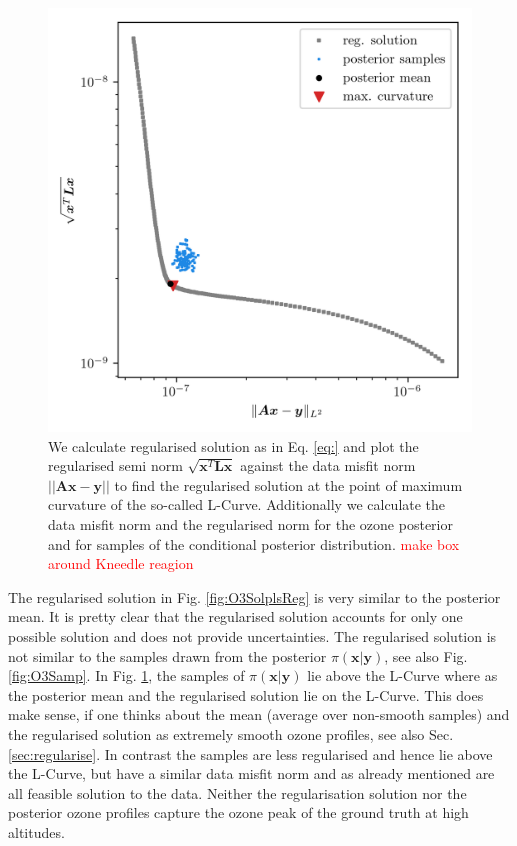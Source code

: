 \begin{figure}[ht!]
	\centering
	\includegraphics{LCurvePhD.png}
	\caption[Plot of the L-curve to find the regularised solution.]{We calculate regularised solution as in Eq. \ref{eq:} and plot the regularised semi norm $\sqrt{\bm{x}^T\bm{Lx}}$ against the data misfit norm $||\bm{Ax} -\bm{y} ||$ to find the regularised solution at the point of maximum curvature of the so-called L-Curve. Additionally we calculate the data misfit norm and the regularised norm for the ozone posterior and for samples of the conditional posterior distribution. \textcolor{red}{make box around Kneedle reagion}}
	\label{fig:LCurve}
\end{figure}

The regularised solution in Fig. \ref{fig:O3SolplsReg} is very similar to the posterior mean.
It is pretty clear that the regularised solution accounts for only one possible solution and does not provide uncertainties. The regularised solution is not similar to the samples drawn from the posterior $\pi(\bm{x}| \bm{y})$, see also Fig. \ref{fig:O3Samp}.
In Fig. \ref{fig:LCurve}, the samples of $\pi(\bm{x}| \bm{y})$ lie above the L-Curve where as the posterior mean and the regularised solution lie on the L-Curve.
This does make sense, if one thinks about the mean (average over non-smooth samples) and the regularised solution as extremely smooth ozone profiles, see also Sec. \ref{sec:regularise}.
In contrast the samples are less regularised and hence lie above the L-Curve, but have a similar data misfit norm and as already mentioned are all feasible solution to the data.
Neither the regularisation solution nor the posterior ozone profiles capture the ozone peak of the ground truth at high altitudes.
\clearpage

